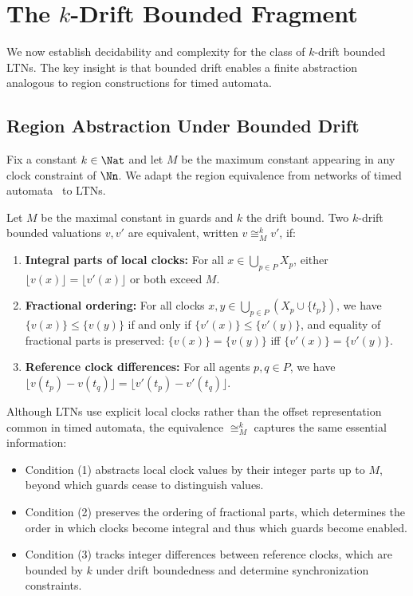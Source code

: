 \section{The $k$-Drift Bounded Fragment}
\label{sec:k-drift-fragment}

We now establish decidability and complexity for the class of $k$-drift bounded LTNs. The key insight is that bounded drift enables a finite abstraction analogous to region constructions for timed automata.

\subsection{Region Abstraction Under Bounded Drift}
\label{sec:k-regions}

Fix a constant $k\in\Nat$ and let $M$ be the maximum constant appearing in any clock constraint of $\Nn$. We adapt the region equivalence from networks of timed automata~\cite{DBLP:conf/concur/HerbreteauSW22} to LTNs.

\begin{definition}
\label{def:k-region-equiv}
Let $M$ be the maximal constant in guards and $k$ the drift bound. Two $k$-drift bounded valuations $v, v'$ are equivalent, written $v \cong_M^k v'$, if:
\begin{enumerate}
    \item \textbf{Integral parts of local clocks:} For all $x \in \bigcup_{p \in P} X_p$, either $\lfloor v(x) \rfloor = \lfloor v'(x) \rfloor$ or both exceed $M$.
    
    \item \textbf{Fractional ordering:} For all clocks $x, y \in \bigcup_{p \in P} (X_p \cup \{t_p\})$, we have $\{v(x)\} \leq \{v(y)\}$ if and only if $\{v'(x)\} \leq \{v'(y)\}$, and equality of fractional parts is preserved: $\{v(x)\} = \{v(y)\}$ iff $\{v'(x)\} = \{v'(y)\}$.
    
    \item \textbf{Reference clock differences:} For all agents $p, q \in P$, we have $\lfloor v(t_p) - v(t_q) \rfloor = \lfloor v'(t_p) - v'(t_q) \rfloor$.
\end{enumerate}
\end{definition}

Although LTNs use explicit local clocks rather than the offset representation common in timed automata, the equivalence $\cong_M^k$ captures the same essential information:
\begin{itemize}
\item Condition (1) abstracts local clock values by their integer parts up to $M$, beyond which guards cease to distinguish values.
\item Condition (2) preserves the ordering of fractional parts, which determines the order in which clocks become integral and thus which guards become enabled.
\item Condition (3) tracks integer differences between reference clocks, which are bounded by $k$ under drift boundedness and determine synchronization constraints.
\end{itemize}

